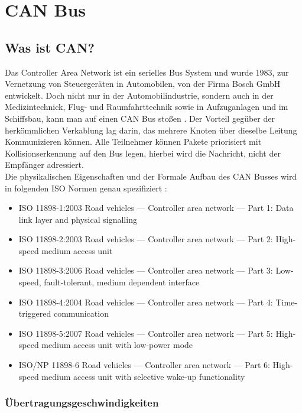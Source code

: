 \section{CAN Bus}

\subsection{Was ist CAN?}
	
Das Controller Area Network ist ein serielles Bus System und wurde
1983, zur Vernetzung von Steuergeräten in Automobilen, von der Firma
Bosch GmbH entwickelt. Doch nicht nur in der Automobilindustrie,
sondern auch in der Medizintechnick, Flug- und Raumfahrttechnik sowie
in Aufzuganlagen und im Schiffsbau, kann man auf einen CAN Bus stoßen
\citep[nach][]{WI1}. Der Vorteil gegüber der herkömmlichen Verkablung
lag darin, das mehrere Knoten über dieselbe Leitung Kommunizieren
können. Alle Teilnehmer können Pakete priorisiert mit
Kollisionserkennung auf den Bus legen, hierbei wird die Nachricht,
nicht der Empfänger adressiert.
\\
Die physikalischen Eigenschaften und der Formale Aufbau des CAN Busses
wird in folgenden ISO Normen genau spezifiziert \citep[nach][]{WI1}:

\begin{itemize}
\item ISO 11898-1:2003 Road vehicles — Controller area network — 
Part 1: Data link layer and physical signalling
\item ISO 11898-2:2003 Road vehicles — Controller area network — 
Part 2: High-speed medium access unit
\item ISO 11898-3:2006 Road vehicles — Controller area network — 
Part 3: Low-speed, fault-tolerant, medium dependent interface
\item ISO 11898-4:2004 Road vehicles — Controller area network — 
Part 4: Time-triggered communication
\item ISO 11898-5:2007 Road vehicles — Controller area network — 
Part 5: High-speed medium access unit with low-power mode
\item ISO/NP 11898-6 Road vehicles — Controller area network — 
Part 6: High-speed medium access unit with selective wake-up functionality
\end{itemize}

\subsubsection{Übertragungsgeschwindigkeiten}

